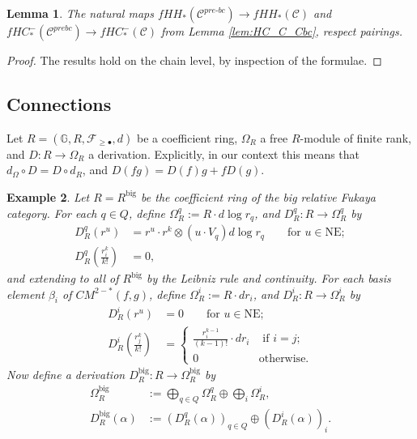\documentclass{article}
\newtheorem{lem}{Lemma}[section]
\newtheorem{eg}[lem]{Example}
\def\G{\mathbb{G}}
\def\G{\mathbb{G}}
\def\nov{r}
\def\cF{\mathcal{F}}
\def\cC{\mathcal{C}}
\def\NE{\mathrm{NE}}
\def\NE{\mathrm{NE}}
\def\prebc{{pre\text{-}bc}}
\def\big{{\operatorname{big}}}
\def\novb{r}
\begin{document}
\begin{lem}\label{lem:C_Cbc_pairings}
The natural maps $fHH_*(\cC^{\prebc}) \to fHH_*(\cC)$ and $fHC_*^-(\cC^{prebc}) \to fHC_*^-(\cC)$ from Lemma \ref{lem:HC_C_Cbc}, respect pairings.
\end{lem}
\begin{proof}
    The results hold on the chain level, by inspection of the formulae.
\end{proof}


\subsection{Connections}

Let $R = (\G,R,\cF_{\ge \bullet},d)$ be a coefficient ring, $\Omega_R$ a free $R$-module of finite rank, and $D:R \to \Omega_R$ a derivation. 
Explicitly, in our context this means that $d_\Omega \circ D = D \circ d_R$, and $D(fg) = D(f) g + fD(g).$ 

\begin{eg}\label{eg:Omega R big}
    Let $R = R^\big$ be the coefficient ring of the big relative Fukaya category. 
    For each $q \in Q$, define $\Omega^q_R := R\cdot d\log \nov_q$, and $D^q_R: R \to \Omega^q_R$ by
    \begin{align*}
        D^q_R(\nov^u) &= \nov^u \cdot \novb^k \otimes (u \cdot V_q) d\log \nov_q \qquad \text{for $u \in \NE$};\\
        D^q_R\left(\frac{\novb_i^{k}}{k!}\right) &= 0,
    \end{align*}
    and extending to all of $R^\big$ by the Leibniz rule and continuity.
    For each basis element $\beta_i$ of $CM^{2-*}(f,g)$, define $\Omega^i_R := R \cdot d\novb_i$, and $D^i_R: R \to \Omega^i_R$ by
    \begin{align*}
        D^i_R(\nov^u) &= 0 \qquad \text{for $u \in \NE$};\\
        D^i_R\left(\frac{\novb_j^{k}}{k!}\right) &= \begin{cases}
                                                        \frac{\novb_i^{k-1}}{(k-1)!}\cdot d\novb_i & \text{ if $i=j$;}\\
                                                        0 & \text{otherwise.}
        \end{cases}                 
    \end{align*}
    Now define a derivation $D_R^\big:R \to \Omega^\big_R$ by
    \begin{align*}
        \Omega^\big_R &:= \bigoplus_{q \in Q} \Omega^q_R \oplus \bigoplus_i \Omega^i_R,\\
        D^\big_R(\alpha) &:= \left(D^q_R(\alpha)\right)_{q \in Q} \oplus \left(D^i_R(\alpha)\right)_i.
    \end{align*}
\end{eg}
\end{document}
